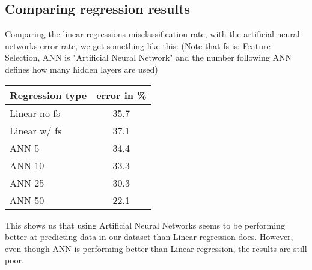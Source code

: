 \subsection{Comparing regression results}
Comparing the linear regressions misclassification rate, with the artificial neural networks error rate, we get something like this: (Note that fs is: Feature Selection, ANN is "Artificial Neural Network" and the number following ANN defines how many hidden layers are used)
\begin{table}[!h]
\begin{longtable}{lc} \hline
Regression type & error in \% \\ \hline
Linear no fs & 35.7 \\
Linear w/ fs & 37.1\\
ANN 5 & 34.4 \\
ANN 10 & 33.3 \\
ANN 25 & 30.3 \\
ANN 50 & 22.1\\ \hline
\end{longtable}
\end{table}
This shows us that using Artificial Neural Networks seems to be performing better at predicting data in our dataset than Linear regression does. However, even though ANN is performing better than Linear regression, the results are still poor.
